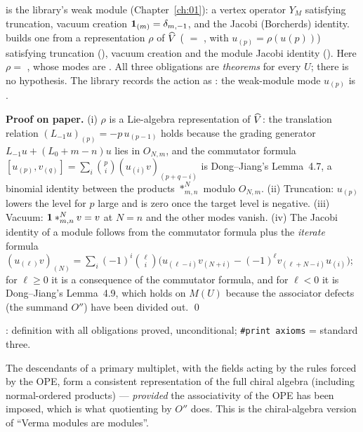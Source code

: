 \begin{dictionary}
 is the library's weak module (Chapter~\ref{ch:01}): a vertex operator $Y_M$ satisfying truncation,
vacuum creation $\mathbf{1}_{(m)} = \delta_{m,-1}$, and the Jacobi (Borcherds) identity. 
builds one from a representation $\rho$ of $\widehat{V}$ ( $=$ ,
with $u_{(p)} = \rho(u(p))$) satisfying truncation (), vacuum creation and the module Jacobi identity
(). Here $\rho = $ , whose modes are . All three obligations are
\emph{theorems} for every $U$; there is no hypothesis. The library records the action as :
the weak-module mode $u_{(p)}$ is .
\end{dictionary}

\textbf{Proof on paper.} (i) $\rho$ is a Lie-algebra representation of $\widehat{V}$: the translation relation
$(L_{-1}u)_{(p)} = -p\,u_{(p-1)}$ holds because the grading generator $L_{-1}u+(L_0+m-n)u$ lies in $O_{N,m}$, and the
commutator formula $[u_{(p)},v_{(q)}] = \sum_i\binom pi(u_{(i)}v)_{(p+q-i)}$ is Dong--Jiang's Lemma~4.7, a binomial identity
between the products $*^N_{m,n}$ modulo $O_{N,m}$. (ii) Truncation: $u_{(p)}$ lowers the level for $p$ large and is zero once
the target level is negative. (iii) Vacuum: $\mathbf{1}*^N_{m,n}v = v$ at $N = n$ and the other modes vanish. (iv) The Jacobi
identity of a module follows from the commutator formula plus the \emph{iterate} formula
$(u_{(\ell)}v)_{(N)} = \sum_i(-1)^i\binom\ell i\bigl(u_{(\ell-i)}v_{(N+i)} - (-1)^\ell v_{(\ell+N-i)}u_{(i)}\bigr)$; for $\ell\ge0$ it
is a consequence of the commutator formula, and for $\ell<0$ it is Dong--Jiang's Lemma~4.9, which holds on $M(U)$ because the
associator defects (the summand $O''$) have been divided out. \qed

\begin{status}
: definition with all obligations proved, unconditional; \texttt{\#print axioms} = standard three.
\end{status}

\begin{physics}
The descendants of a primary multiplet, with the fields acting by the rules forced by the OPE, form a consistent
representation of the full chiral algebra (including normal-ordered products) --- \emph{provided} the associativity of the
OPE has been imposed, which is what quotienting by $O''$ does. This is the chiral-algebra version of ``Verma modules are
modules''.
\end{physics}

